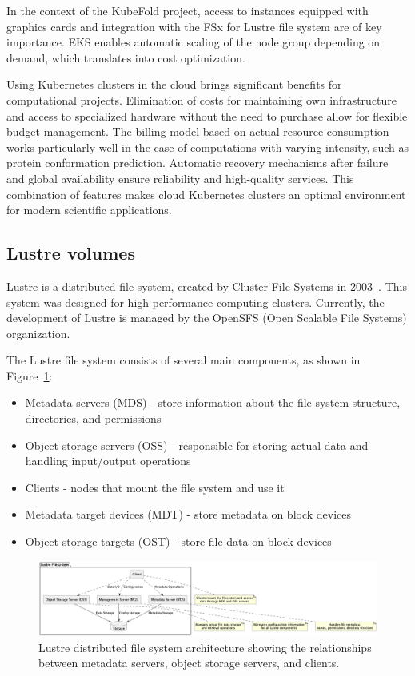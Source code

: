 In the context of the KubeFold project, access to instances equipped with graphics cards and integration with the FSx for Lustre file system are of key importance.
EKS enables automatic scaling of the node group depending on demand, which translates into cost optimization.

Using Kubernetes clusters in the cloud brings significant benefits for computational projects.
Elimination of costs for maintaining own infrastructure and access to specialized hardware without the need to purchase allow for flexible budget management.
The billing model based on actual resource consumption works particularly well in the case of computations with varying intensity, such as protein conformation prediction.
Automatic recovery mechanisms after failure and global availability ensure reliability and high-quality services.
This combination of features makes cloud Kubernetes clusters an optimal environment for modern scientific applications.

\subsection{Lustre volumes}\label{subsec:lustre-volumes}

Lustre is a distributed file system, created by Cluster File Systems in 2003~\cite{lustre_fs}.
This system was designed for high-performance computing clusters.
Currently, the development of Lustre is managed by the OpenSFS (Open Scalable File Systems) organization.

The Lustre file system consists of several main components, as shown in Figure~\ref{fig:lustre-arch}:
\begin{itemize}
    \item Metadata servers (MDS) - store information about the file system structure, directories, and permissions
    \item Object storage servers (OSS) - responsible for storing actual data and handling input/output operations
    \item Clients - nodes that mount the file system and use it
    \item Metadata target devices (MDT) - store metadata on block devices
    \item Object storage targets (OST) - store file data on block devices
\end{itemize}

\begin{figure}[htbp]
    \centering
    \includegraphics[width=\textwidth]{images/lustre.png}
    \caption{Lustre distributed file system architecture showing the relationships between metadata servers, object storage servers, and clients.}
    \label{fig:lustre-arch}
\end{figure}

